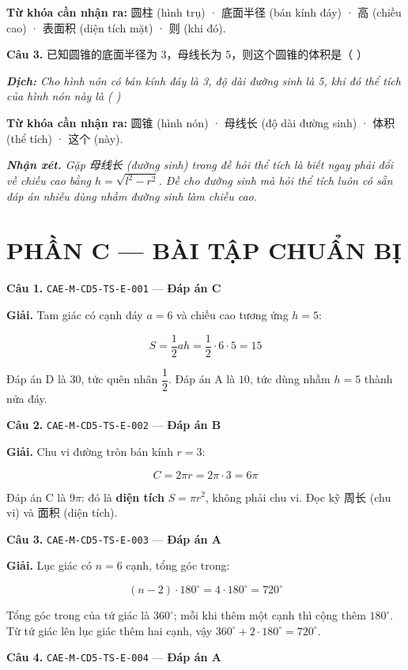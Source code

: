 \documentclass[11pt, a4paper]{article}
\begin{document}
\textbf{Từ khóa cần nhận ra:} 圆柱 (hình trụ) · 底面半径 (bán kính đáy) · 高 (chiều cao) · 表面积 (diện tích mặt) · 则 (khi đó).

\textbf{Câu 3.} 已知圆锥的底面半径为 3，母线长为 5，则这个圆锥的体积是（ ）

\noindent\emph{\textbf{Dịch:} Cho hình nón có bán kính đáy là 3, độ dài đường sinh là 5, khi đó thể tích của hình nón này là ( )}

\textbf{Từ khóa cần nhận ra:} 圆锥 (hình nón) · 母线长 (độ dài đường sinh) · 体积 (thể tích) · 这个 (này).

\noindent\emph{\textbf{Nhận xét.} Gặp 母线长 (đường sinh) trong đề hỏi thể tích là biết ngay phải đổi về chiều cao bằng $h = \sqrt{l^2-r^2}$. Đề cho đường sinh mà hỏi thể tích luôn có sẵn đáp án nhiễu dùng nhầm đường sinh làm chiều cao.}

\section{PHẦN C — BÀI TẬP CHUẨN BỊ}

\textbf{Câu 1.} \texttt{CAE-M-CD5-TS-E-001} — \textbf{Đáp án C}

\textbf{Giải.} Tam giác có cạnh đáy $a = 6$ và chiều cao tương ứng $h = 5$:

$$S = \frac{1}{2}ah = \frac{1}{2} \cdot 6 \cdot 5 = 15$$

 Đáp án D là $30$, tức quên nhân $\dfrac{1}{2}$. Đáp án A là $10$, tức dùng nhầm $h = 5$ thành nửa đáy.

\textbf{Câu 2.} \texttt{CAE-M-CD5-TS-E-002} — \textbf{Đáp án B}

\textbf{Giải.} Chu vi đường tròn bán kính $r = 3$:

$$C = 2\pi r = 2\pi \cdot 3 = 6\pi$$

 Đáp án C là $9\pi$: đó là \textbf{diện tích} $S = \pi r^2$, không phải chu vi. Đọc kỹ 周长 (chu vi) và 面积 (diện tích).

\textbf{Câu 3.} \texttt{CAE-M-CD5-TS-E-003} — \textbf{Đáp án A}

\textbf{Giải.} Lục giác có $n = 6$ cạnh, tổng góc trong:

$$(n-2) \cdot 180^\circ = 4 \cdot 180^\circ = 720^\circ$$

 Tổng góc trong của tứ giác là $360^\circ$; mỗi khi thêm một cạnh thì cộng thêm $180^\circ$. Từ tứ giác lên lục giác thêm hai cạnh, vậy $360^\circ + 2 \cdot 180^\circ = 720^\circ$.

\textbf{Câu 4.} \texttt{CAE-M-CD5-TS-E-004} — \textbf{Đáp án A}
\end{document}
